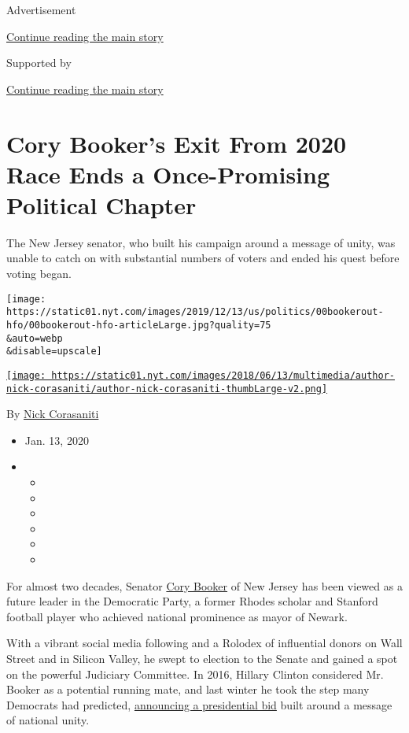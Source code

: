 Advertisement

\protect\hyperlink{after-top}{Continue reading the main story}

Supported by

\protect\hyperlink{after-sponsor}{Continue reading the main story}

\hypertarget{cory-bookers-exit-from-2020-race-ends-a-once-promising-political-chapter}{%
\section{Cory Booker's Exit From 2020 Race Ends a Once-Promising
Political
Chapter}\label{cory-bookers-exit-from-2020-race-ends-a-once-promising-political-chapter}}

The New Jersey senator, who built his campaign around a message of
unity, was unable to catch on with substantial numbers of voters and
ended his quest before voting began.

\texttt{[image: https://static01.nyt.com/images/2019/12/13/us/politics/00bookerout-hfo/00bookerout-hfo-articleLarge.jpg?quality=75\\\&auto=webp\\\&disable=upscale]}

\href{https://www.nytimes.com/by/nick-corasaniti}{\texttt{[image: https://static01.nyt.com/images/2018/06/13/multimedia/author-nick-corasaniti/author-nick-corasaniti-thumbLarge-v2.png]}}

By \href{https://www.nytimes.com/by/nick-corasaniti}{Nick Corasaniti}

\begin{itemize}
\item
  Jan. 13, 2020
\item
  \begin{itemize}
  \item
  \item
  \item
  \item
  \item
  \item
  \end{itemize}
\end{itemize}

For almost two decades, Senator
\href{https://www.nytimes.com/interactive/2020/us/elections/cory-booker.html}{Cory
Booker} of New Jersey has been viewed as a future leader in the
Democratic Party, a former Rhodes scholar and Stanford football player
who achieved national prominence as mayor of Newark.

With a vibrant social media following and a Rolodex of influential
donors on Wall Street and in Silicon Valley, he swept to election to the
Senate and gained a spot on the powerful Judiciary Committee. In 2016,
Hillary Clinton considered Mr. Booker as a potential running mate, and
last winter he took the step many Democrats had predicted,
\href{https://www.nytimes.com/2019/02/01/us/politics/cory-booker-2020.html}{announcing
a presidential bid} built around a message of national unity.

